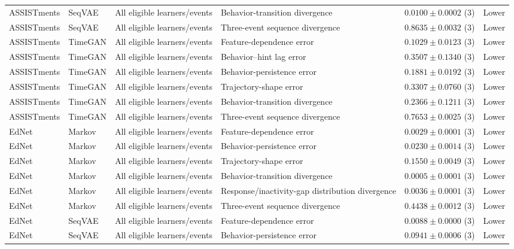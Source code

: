 \begin{longtable}{@{}p{2.25cm}p{2.05cm}p{4.7cm}p{5.0cm}p{2.6cm}p{1.25cm}@{}}
ASSISTments & SeqVAE & All eligible learners/events & Behavior-transition divergence & $0.0100 \mathbin{\pm} 0.0002$ (3) & Lower \\
ASSISTments & SeqVAE & All eligible learners/events & Three-event sequence divergence & $0.8635 \mathbin{\pm} 0.0032$ (3) & Lower \\
ASSISTments & TimeGAN & All eligible learners/events & Feature-dependence error & $0.1029 \mathbin{\pm} 0.0123$ (3) & Lower \\
ASSISTments & TimeGAN & All eligible learners/events & Behavior--hint lag error & $0.3507 \mathbin{\pm} 0.1340$ (3) & Lower \\
ASSISTments & TimeGAN & All eligible learners/events & Behavior-persistence error & $0.1881 \mathbin{\pm} 0.0192$ (3) & Lower \\
ASSISTments & TimeGAN & All eligible learners/events & Trajectory-shape error & $0.3307 \mathbin{\pm} 0.0760$ (3) & Lower \\
ASSISTments & TimeGAN & All eligible learners/events & Behavior-transition divergence & $0.2366 \mathbin{\pm} 0.1211$ (3) & Lower \\
ASSISTments & TimeGAN & All eligible learners/events & Three-event sequence divergence & $0.7653 \mathbin{\pm} 0.0025$ (3) & Lower \\
EdNet & Markov & All eligible learners/events & Feature-dependence error & $0.0029 \mathbin{\pm} 0.0001$ (3) & Lower \\
EdNet & Markov & All eligible learners/events & Behavior-persistence error & $0.0230 \mathbin{\pm} 0.0014$ (3) & Lower \\
EdNet & Markov & All eligible learners/events & Trajectory-shape error & $0.1550 \mathbin{\pm} 0.0049$ (3) & Lower \\
EdNet & Markov & All eligible learners/events & Behavior-transition divergence & $0.0005 \mathbin{\pm} 0.0001$ (3) & Lower \\
EdNet & Markov & All eligible learners/events & Response/inactivity-gap distribution divergence & $0.0036 \mathbin{\pm} 0.0001$ (3) & Lower \\
EdNet & Markov & All eligible learners/events & Three-event sequence divergence & $0.4438 \mathbin{\pm} 0.0012$ (3) & Lower \\
EdNet & SeqVAE & All eligible learners/events & Feature-dependence error & $0.0088 \mathbin{\pm} 0.0000$ (3) & Lower \\
EdNet & SeqVAE & All eligible learners/events & Behavior-persistence error & $0.0941 \mathbin{\pm} 0.0006$ (3) & Lower \\

\end{longtable}
